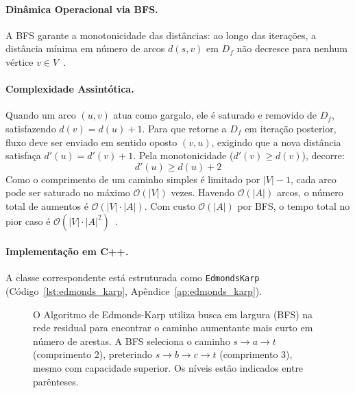 \paragraph{Dinâmica Operacional via BFS.}
A BFS garante a monotonicidade das distâncias: ao longo das iterações, a distância mínima em número de arcos $d(s, v)$ em $D_f$ não decresce para nenhum vértice $v \in V$~\cite{cook1998combinatorial}.

\paragraph{Complexidade Assintótica.}
Quando um arco $(u,v)$ atua como gargalo, ele é saturado e removido de $D_f$, satisfazendo $d(v) = d(u) + 1$. Para que retorne a $D_f$ em iteração posterior, fluxo deve ser enviado em sentido oposto $(v,u)$, exigindo que a nova distância satisfaça $d'(u) = d'(v) + 1$. Pela monotonicidade ($d'(v) \ge d(v)$), decorre:
\begin{equation}
    d'(u) \ge d(u) + 2
\end{equation}
Como o comprimento de um caminho simples é limitado por $|V| - 1$, cada arco pode ser saturado no máximo $\mathcal{O}(|V|)$ vezes. Havendo $\mathcal{O}(|A|)$ arcos, o número total de aumentos é $\mathcal{O}(|V| \cdot |A|)$. Com custo $\mathcal{O}(|A|)$ por BFS, o tempo total no pior caso é $\mathcal{O}(|V| \cdot |A|^2)$~\cite{korte2018combinatorial}.

\paragraph{Implementação em C++.}
A classe correspondente está estruturada como \lstinline{EdmondsKarp} (Código~\ref{lst:edmonds_karp}, Apêndice~\ref{ap:edmonds_karp}).

\begin{figure}[!ht]
\centering
{}
\caption{O Algoritmo de Edmonds-Karp utiliza busca em largura (BFS) na rede residual para encontrar o caminho aumentante mais curto em número de arestas. A BFS seleciona o caminho $s \to a \to t$ (comprimento 2), preterindo $s \to b \to c \to t$ (comprimento 3), mesmo com capacidade superior. Os níveis estão indicados entre parênteses.}
\label{fig:edmonds_karp}
\end{figure}


